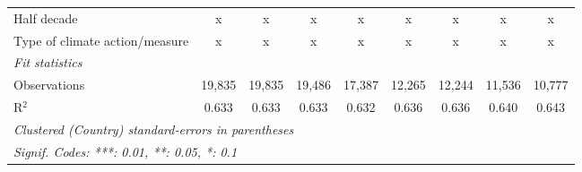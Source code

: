 \begin{tabular}{lcccccccc}
   Half decade                                                & x            & x            & x            & x            & x            & x            & x            & x\\  
   Type of climate action/measure                             & x            & x            & x            & x            & x            & x            & x            & x\\  
   \midrule \emph{Fit statistics}\\
   Observations                                               & 19,835       & 19,835       & 19,486       & 17,387       & 12,265       & 12,244       & 11,536       & 10,777\\  
   R$^2$                                                      & 0.633        & 0.633        & 0.633        & 0.632        & 0.636        & 0.636        & 0.640        & 0.643\\  
   \midrule
   \multicolumn{9}{l}{\emph{Clustered (Country) standard-errors in parentheses}}\\
   \multicolumn{9}{l}{\emph{Signif. Codes: ***: 0.01, **: 0.05, *: 0.1}}\\
\end{tabular}
\par\endgroup


